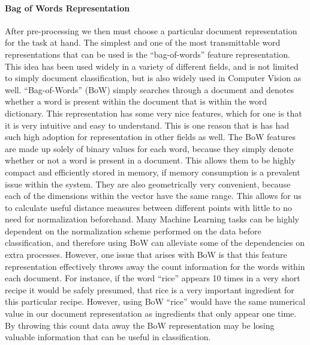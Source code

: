 \documentclass[paper=a4, fontsize=11pt]{scrartcl} %
\begin{document}
\paragraph{Bag of Words Representation}
After pre-processing we then must choose a particular document representation for the task at hand.  
The simplest and one of the most transmittable word representations that can be used is the ``bag-of-words'' feature representation.  
This idea has been used widely in a variety of different fields, and is not limited to simply document classification, but is also widely used in Computer Vision as well.  
``Bag-of-Words'' (BoW) simply searches through a document and denotes whether a word is present within the document that is within the word dictionary.  
This representation has some very nice features, which for one is that it is very intuitive and easy to understand.  
This is one reason that is has had such high adoption for representation in other fields as well.  The BoW features are made up solely of binary values for each word, because they simply denote whether or not a word is present in a document.  
This allows them to be highly compact and efficiently stored in memory, if memory consumption is a prevalent issue within the system.  
They are also geometrically very convenient, because each of the dimensions within the vector have the same range.  
This allows for us to calculate useful distance measures between different points with little to no need for normalization beforehand.  
Many Machine Learning tasks can be highly dependent on the normalization scheme performed on the data before classification, and therefore using BoW can alleviate some of the dependencies on extra processes.  
However, one issue that arises with BoW is that this feature representation effectively throws away the count information for the words within each document.  
For instance, if the word ``rice'' appears 10 times in a very short recipe it would be safely presumed, that rice is a very important ingredient for this particular recipe.  
However, using BoW ``rice'' would have the same numerical value in our document representation as ingredients that only appear one time.  
By throwing this count data away the BoW representation may be losing valuable information that can be useful in classification.
\end{document}
